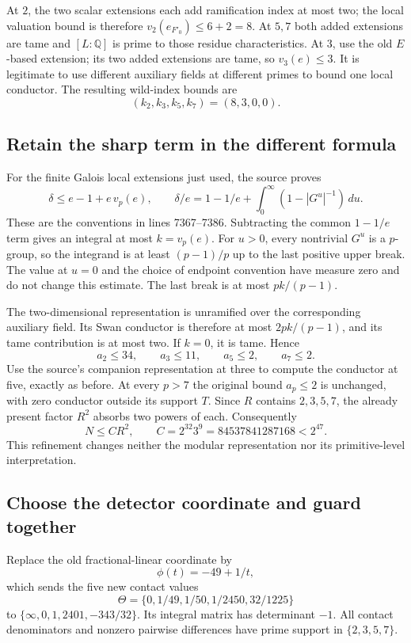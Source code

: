 At $2$, the two scalar extensions each add ramification index at most
two; the local valuation bound is therefore $v_2(e_{F'_0})\le6+2=8$.
At $5,7$ both added extensions are tame and $[L:\mathbb Q]$ is prime
to those residue characteristics. At $3$, use the old $E$-based extension;
its two added extensions are tame, so $v_3(e)\le3$. It is legitimate to
use different auxiliary fields at different primes to bound one local
conductor. The resulting wild-index bounds are
\[
 (k_2,k_3,k_5,k_7)=(8,3,0,0).
\]

\subsection{Retain the sharp term in the different formula}

For the finite Galois local extensions just used, the source proves
\[
 \delta\le e-1+e\,v_p(e),\qquad
 \delta/e=1-1/e+\int_0^\infty(1-|G^u|^{-1})\,du.
\]
These are the conventions in lines 7367--7386. Subtracting the common
$1-1/e$ term gives an integral at most $k=v_p(e)$.
For $u>0$, every nontrivial $G^u$ is a $p$-group, so the integrand is
at least $(p-1)/p$ up to the last positive upper break. The value at
$u=0$ and the choice of endpoint convention have measure zero and do not
change this estimate. The last break is at most $pk/(p-1)$.

The two-dimensional representation is unramified over the corresponding
auxiliary field. Its Swan conductor is therefore at most $2pk/(p-1)$,
and its tame contribution is at most two. If $k=0$, it is tame. Hence
\[
 a_2\le34,\qquad a_3\le11,\qquad a_5\le2,\qquad a_7\le2.
\]
Use the source's companion representation at three to compute the
conductor at five, exactly as before. At every $p>7$ the original bound
$a_p\le2$ is unchanged, with zero conductor outside its support $T$.
Since $R$ contains $2,3,5,7$, the already present factor $R^2$ absorbs
two powers of each. Consequently
\[
 \boxed{N\le C R^2,\qquad C=2^{32}3^9=84537841287168<2^{47}.}
\]
This refinement changes neither the modular representation nor its
primitive-level interpretation.

\subsection{Choose the detector coordinate and guard together}

Replace the old fractional-linear coordinate by
\[
 \phi(t)=-49+1/t,
\]
which sends the five new contact values
\[
 \Theta=\{0,1/49,1/50,1/2450,32/1225\}
\]
to $\{\infty,0,1,2401,-343/32\}$. Its integral matrix has determinant
$-1$. All contact denominators and nonzero pairwise differences have
prime support in $\{2,3,5,7\}$.


